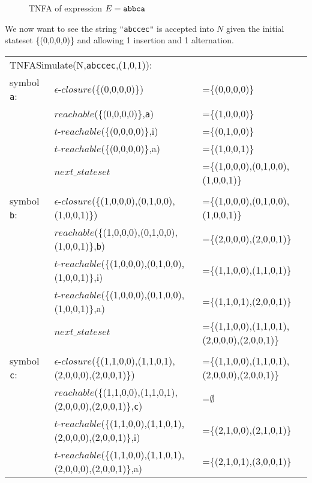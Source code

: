 \begin{myex}
\begin{figure}[h!]
\begin{center}
\end{center}
\caption{TNFA of expression $E = {\tt abbca}$}
\label{tnfa:simfail}
\end{figure}
We now want to see the string {\tt "abccec"} is accepted into $N$ given the initial stateset \{(0,0,0,0)\} and allowing 1 insertion and 1 alternation.\\
\begin{table}[h!]
\small
\begin{tabular}{l l l}
\multicolumn{2}{l}{TNFASimulate(N,{\tt abccec},(1,0,1)):}\\
symbol {\tt a}:& $\epsilon$-$closure$(\{(0,0,0,0)\})&=\{(0,0,0,0)\}\\
&$reachable$(\{(0,0,0,0)\},{\tt a})&=\{(1,0,0,0)\}\\
&$t$-$reachable$(\{(0,0,0,0)\},i)&=\{(0,1,0,0)\}\\
&$t$-$reachable$(\{(0,0,0,0)\},a)&=\{(1,0,0,1)\}\\
&$next\_stateset$&=\{(1,0,0,0),(0,1,0,0),(1,0,0,1)\}\\
\\
symbol {\tt b}:& $\epsilon$-$closure$(\{(1,0,0,0),(0,1,0,0),(1,0,0,1)\})&=\{(1,0,0,0),(0,1,0,0),(1,0,0,1)\}\\
&$reachable$(\{(1,0,0,0),(0,1,0,0),(1,0,0,1)\},{\tt b})&=\{(2,0,0,0),(2,0,0,1)\}\\
&$t$-$reachable$(\{(1,0,0,0),(0,1,0,0),(1,0,0,1)\},i)&=\{(1,1,0,0),(1,1,0,1)\}\\
&$t$-$reachable$(\{(1,0,0,0),(0,1,0,0),(1,0,0,1)\},a)&=\{(1,1,0,1),(2,0,0,1)\}\\
&$next\_stateset$&=\{(1,1,0,0),(1,1,0,1),(2,0,0,0),(2,0,0,1)\}\\
\\
symbol {\tt c}:& $\epsilon$-$closure$(\{(1,1,0,0),(1,1,0,1),(2,0,0,0),(2,0,0,1)\})&=\{(1,1,0,0),(1,1,0,1),(2,0,0,0),(2,0,0,1)\}\\
&$reachable$(\{(1,1,0,0),(1,1,0,1),(2,0,0,0),(2,0,0,1)\},{\tt c})&=$\emptyset$\\
&$t$-$reachable$(\{(1,1,0,0),(1,1,0,1),(2,0,0,0),(2,0,0,1)\},i)&=\{(2,1,0,0),(2,1,0,1)\}\\
&$t$-$reachable$(\{(1,1,0,0),(1,1,0,1),(2,0,0,0),(2,0,0,1)\},a)&=\{(2,1,0,1),(3,0,0,1)\}\\

\end{tabular}
\end{table}
\end{myex}
